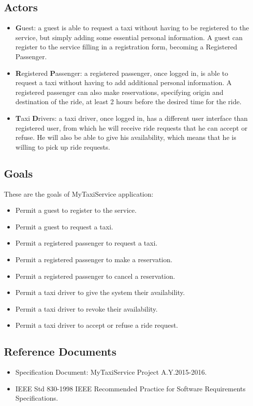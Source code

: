 \subsection{Actors}
\begin{itemize}
	\item \textbf{G}uest: a guest is able to request a taxi without having to be registered to the service, but simply adding some essential personal information. A guest can register to the service filling in a registration form, becoming a Registered Passenger.
	\item \textbf{R}egistered \textbf{P}assenger: a registered passenger, once logged in, is able to request a taxi without having to add additional personal information. A registered passenger can also make reservations, specifying origin and destination of the ride, at least 2 hours before the desired time for the ride.
	\item \textbf{T}axi \textbf{D}rivers: a taxi driver, once logged in, has a different user interface than registered user, from which he will receive ride requests that he can accept or refuse. He will also be able to give his availability, which means that he is willing to pick up ride requests.
\end{itemize}
\subsection{Goals}
These are the goals of MyTaxiService application:
\begin{itemize}
	\item Permit a guest to register to the service.
	\item Permit a guest to request a taxi.
	\item Permit a registered passenger to request a taxi.
	\item Permit a registered passenger to make a reservation.
	\item Permit a registered passenger to cancel a reservation.
	\item Permit a taxi driver to give the system their availability.
	\item Permit a taxi driver to revoke their availability.
	\item Permit a taxi driver to accept or refuse a ride request.
\end{itemize}
\subsection{Reference Documents}
\begin{itemize}
	\item Specification Document: MyTaxiService Project A.Y.2015-2016.
	\item IEEE Std 830-1998 IEEE Recommended Practice for Software Requirements Specifications.
\end{itemize}
